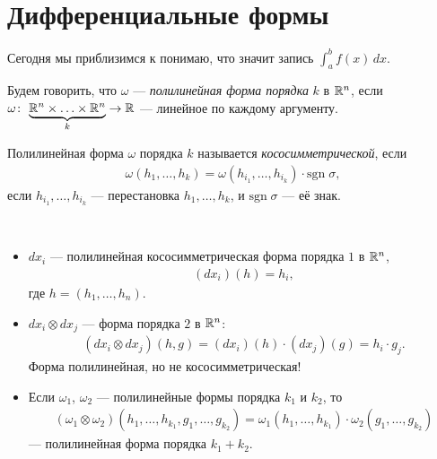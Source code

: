 
\section{Дифференциальные формы}

Сегодня мы приблизимся к понимаю, что значит запись $\int_{a}^{b} f(x) \, dx $.

\begin{df}
 Будем говорить, что $\omega$  --- \textit{полилинейная форма порядка}  $k$ в $\mathbb{R}^{n}$, если $\omega \colon\, \underbrace{\mathbb{R}^{n} \times \ldots \times \mathbb{R}^{n}}_{k} \to \mathbb{R}  $ --- линейное по каждому аргументу.
\end{df}
\begin{df}
 Полилинейная форма $\omega$ порядка $k$ называется \textit{кососимметрической}, если
 \begin{align*}
  \omega(h_1, \ldots, h_k) = \omega(h_{i_1}, \ldots, h_{i_k}) \cdot \mathrm{sgn}\; \sigma,
 \end{align*} если $h_{i_1}, \ldots, h_{i_k}$ --- перестановка $h_1, \ldots, h_k$, и $\mathrm{sgn}\;{\sigma}$ --- её знак.
\end{df}
\begin{exmpl}\
\begin{itemize}
 \item $dx_i$ --- полилинейная кососимметрическая форма порядка $1$ в $\mathbb{R}^{n}$,
  \begin{align*}
   ( dx_i )(h) = h_i
  ,\end{align*} где $h = (h_1, \ldots, h_n)$.
 \item $dx_i \otimes dx_j$ --- форма порядка $2$ в $\mathbb{R}^{n}$:
  \begin{align*}
   (dx_i \otimes dx_j)(h, g) = (dx_i)(h) \cdot (dx_j)(g) = h_i \cdot g_j
  .\end{align*} Форма полилинейная, но не кососимметрическая!
 \item Если $\omega_1$, $\omega_2$ --- полилинейные формы порядка $k_1$ и $k_2$, то
  \begin{align*}
   (\omega_1 \otimes \omega_2) (h_1, \ldots, h_{k_1}, g_1, \ldots, g_{k_2}) = \omega_1(h_1, \ldots, h_{k_1}) \cdot \omega_2(g_1, \ldots, g_{k_2})
  \end{align*}  --- полилинейная форма порядка $k_1 + k_2$.
\end{itemize} 
\end{exmpl}
